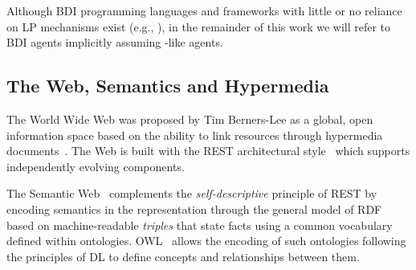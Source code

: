 \documentclass[
]{ceurart}
\begin{document}
%
Although \ac{BDI} programming languages and frameworks with little or no reliance on \ac{LP} mechanisms exist
(e.g., \cite{map2005sp,kampik2019emas}),
in the remainder of this work we will refer to \ac{BDI} agents implicitly assuming -like agents.

\subsection{The Web, Semantics and Hypermedia}

The World Wide Web was proposed by Tim Berners-Lee as a global, open information space
based on the ability to link resources through hypermedia documents~\cite{DBLP:journals/cn/Berners-LeeCG92}.
%
The Web is built with the \ac{REST} architectural style~\cite{DBLP:journals/toit/FieldingT02}
which supports independently evolving components.
%

The Semantic Web~\cite{BernersLee2001} complements the \emph{self-descriptive} principle of \ac{REST}
by encoding semantics in the representation through the general model of \ac{RDF}~\cite{RDF_Concepts_W3C:14}
based on machine-readable \emph{triples}
that state facts using a common vocabulary defined within ontologies.
%
{OWL}~\cite{OWL_Syntax_W3C:12} allows the encoding of such ontologies following the principles of \ac{DL} to define concepts and relationships between them.
%
\end{document}
